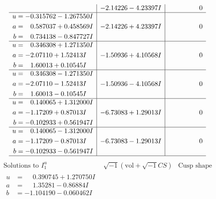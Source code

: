 \documentclass[1p]{elsarticle_modified}
\theoremstyle{definition}
\newcommand{\I}{\sqrt{-1}}
\begin{document}
$$\begin{array}{c|c|c}
 & -2.14226 - 4.23397 I & \phantom{-0.000000 } 0 \\ \hline\begin{aligned}
u &= -0.315762 - 1.267550 I \\
a &= \phantom{-}0.587037 + 0.458569 I \\
b &= \phantom{-}0.734138 - 0.847727 I\end{aligned}
 & -2.14226 + 4.23397 I & \phantom{-0.000000 } 0 \\ \hline\begin{aligned}
u &= \phantom{-}0.346308 + 1.271350 I \\
a &= -2.07110 + 1.52413 I \\
b &= \phantom{-}1.60013 + 0.10545 I\end{aligned}
 & -1.50936 + 4.10568 I & \phantom{-0.000000 } 0 \\ \hline\begin{aligned}
u &= \phantom{-}0.346308 - 1.271350 I \\
a &= -2.07110 - 1.52413 I \\
b &= \phantom{-}1.60013 - 0.10545 I\end{aligned}
 & -1.50936 - 4.10568 I & \phantom{-0.000000 } 0 \\ \hline\begin{aligned}
u &= \phantom{-}0.140065 + 1.312000 I \\
a &= -1.17209 + 0.87013 I \\
b &= -0.102933 + 0.561947 I\end{aligned}
 & -6.73083 + 1.29013 I & \phantom{-0.000000 } 0 \\ \hline\begin{aligned}
u &= \phantom{-}0.140065 - 1.312000 I \\
a &= -1.17209 - 0.87013 I \\
b &= -0.102933 - 0.561947 I\end{aligned}
 & -6.73083 - 1.29013 I & \phantom{-0.000000 } 0\\
 \hline 
 \end{array}$$\newpage$$\begin{array}{c|c|c}  
\text{Solutions to }I^u_{1}& \I (\text{vol} + \sqrt{-1}CS) & \text{Cusp shape}\\
 \hline 
\begin{aligned}
u &= \phantom{-}0.390745 + 1.270750 I \\
a &= \phantom{-}1.35281 - 0.86884 I \\
b &= -1.104190 - 0.060462 I\end{aligned}

\end{array}$$
\end{document}
